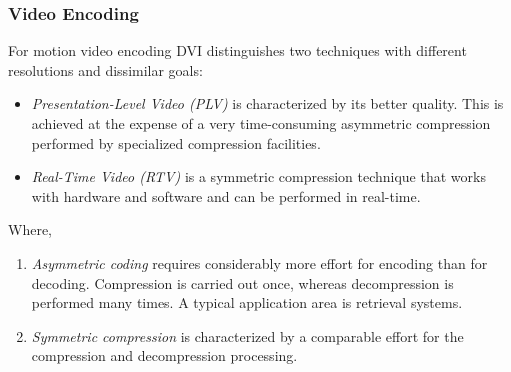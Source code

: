 \subsubsection{Video Encoding}
For motion video encoding DVI distinguishes two techniques with different resolutions and dissimilar goals:

\begin{itemize}
	\item \textit{Presentation-Level Video (PLV)} is characterized by its better quality. This is achieved at the expense of a very time-consuming asymmetric compression
	performed by specialized compression facilities.
	
	\item \textit{Real-Time Video (RTV)} is a symmetric compression technique that works with hardware and software and can be performed in real-time.
\end{itemize}


Where,
\begin{enumerate}
	\item \textit{Asymmetric coding} requires considerably more effort for encoding than for decoding. Compression is carried out once, whereas decompression is performed many times. A typical application area is retrieval systems. 
	
	\item \textit{Symmetric compression} is characterized by a comparable effort for the compression and decompression processing.
\end{enumerate}
